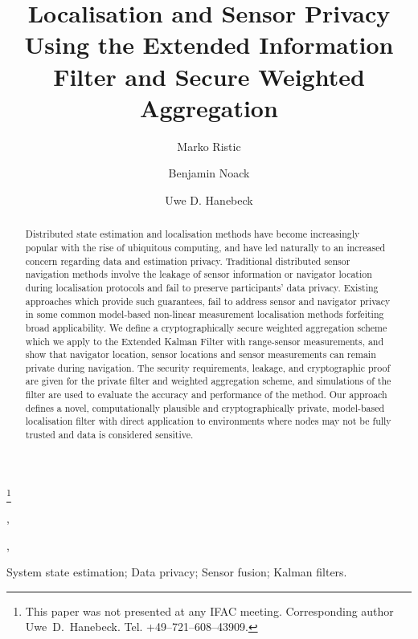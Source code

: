 \documentclass[twocolumn]{autart}
\theoremstyle{definition}
\begin{document}
\begin{frontmatter}

\title{Localisation and Sensor Privacy Using the Extended Information Filter and Secure Weighted Aggregation}

\thanks[footnoteinfo]{This paper was not presented at any IFAC 
meeting. Corresponding author Uwe~D.~Hanebeck. Tel. +49--721--608--43909.}

\author[ISAS]{Marko Ristic},
\author[ISAS]{Benjamin Noack},
\author[ISAS]{Uwe D. Hanebeck}

\address[ISAS]{Intelligent Sensor-Actuator-Systems Laboratory, Institute for Anthropomatics, Karlsruhe Institute of Technology, 76131 Karlsruhe, Germany}

\begin{keyword}
System state estimation; Data privacy; Sensor fusion; Kalman filters.
\end{keyword}

\begin{abstract}
Distributed state estimation and localisation methods have become increasingly popular with the rise of ubiquitous computing, and have led naturally to an increased concern regarding data and estimation privacy. Traditional distributed sensor navigation methods involve the leakage of sensor information or navigator location during localisation protocols and fail to preserve participants’ data privacy. Existing approaches which provide such guarantees, fail to address sensor and navigator privacy in some common model-based non-linear measurement localisation methods forfeiting broad applicability. We define a cryptographically secure weighted aggregation scheme which we apply to the Extended Kalman Filter with range-sensor measurements, and show that navigator location, sensor locations and sensor measurements can remain private during navigation. The security requirements, leakage, and cryptographic proof are given for the private filter and weighted aggregation scheme, and simulations of the filter are used to evaluate the accuracy and performance of the method. Our approach defines a novel, computationally plausible and cryptographically private, model-based localisation filter with direct application to environments where nodes may not be fully trusted and data is considered sensitive.
\end{abstract}

\end{frontmatter}
\end{document}
